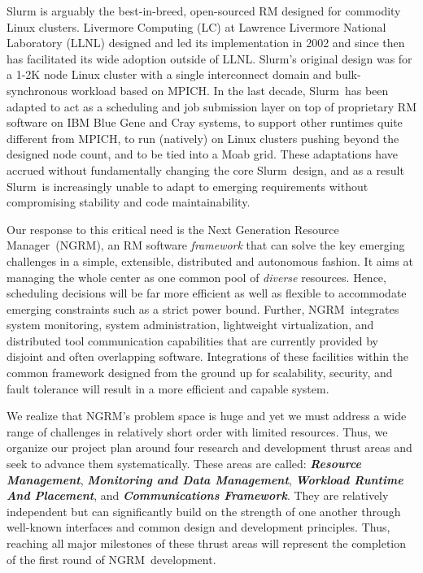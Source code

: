 \documentclass{article}
\newcommand{\ngrm}{NGRM}
\newcommand{\ngrmfull}{Next Generation Resource Manager}
\newcommand{\slurm}{Slurm}
\newcommand{\moab}{Moab}
\begin{document}
\slurm\cite{SlurmDesign} is arguably the
best-in-breed, open-sourced RM designed for commodity Linux clusters.
Livermore Computing (LC) at Lawrence Livermore National Laboratory (LLNL)
designed and led its implementation in 2002 and since then has facilitated
its wide adoption outside of LLNL.
\slurm's original design was for a 1-2K node Linux cluster with a single
interconnect domain and bulk-synchronous workload based on MPICH.
In the last decade, \slurm\ has been adapted
to act as a scheduling and job submission layer on top of proprietary
RM software on IBM Blue Gene and Cray systems,
to support other runtimes quite different from MPICH,
to run (natively) on Linux clusters pushing beyond the designed node count,
and to be tied into a \moab\cite{MOAB:online} grid.
These adaptations have accrued without fundamentally changing the
core \slurm\ design, and as a result \slurm\ is increasingly
unable to adapt to emerging requirements without compromising
stability and code maintainability.

Our response to this critical need is the \ngrmfull\ (\ngrm ), an RM software
{\em framework} that can solve the key emerging challenges 
in a simple, extensible, distributed and autonomous fashion.
It aims at managing the whole center as one common pool of {\em diverse} 
resources. Hence, scheduling decisions will be 
far more efficient as well as flexible to accommodate 
emerging constraints such as a strict power bound. 
Further, \ngrm\ integrates
system monitoring, system administration, lightweight
virtualization, and distributed tool communication capabilities
that are currently provided by disjoint and often overlapping software.
Integrations of these facilities within the common framework designed from
the ground up for scalability, security, and fault tolerance will result
in a more efficient and capable system.

We realize that \ngrm's problem space is huge and yet we must address a wide range 
of challenges in relatively short order with limited resources. Thus, we 
organize our project plan around four research and development thrust areas 
and seek to advance them systematically.
These areas are called:
{\bf{\em Resource Management}},
{\bf{\em Monitoring and Data Management}},
{\bf{\em Workload Runtime And Placement}}, and
{\bf{\em Communications Framework}}.
They are relatively independent but can significantly build on the
strength of one another through well-known interfaces and common design
and development principles.
Thus, reaching all major milestones of these thrust areas 
will represent the completion of the first round of \ngrm\ development. 
\end{document}

